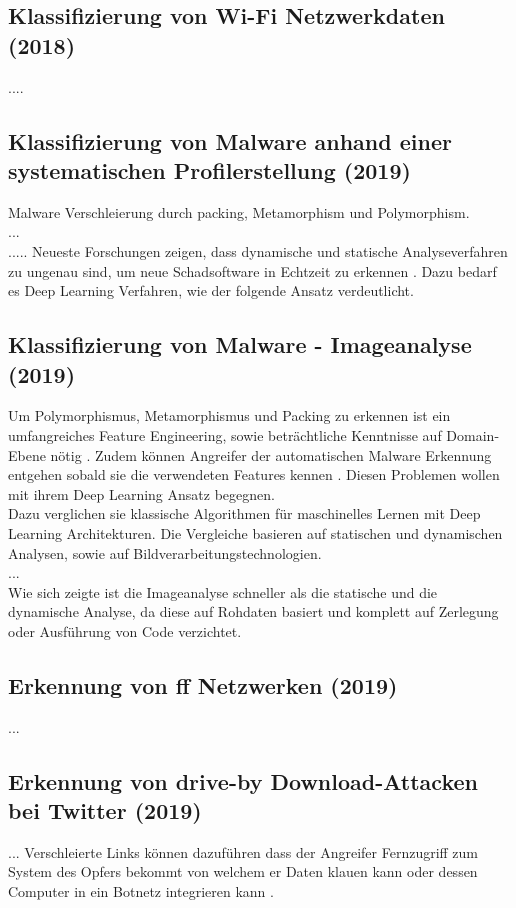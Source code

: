 \documentclass[
    12pt, %
    DIV10,
    ngerman, %
    a4paper, %
    oneside, %
    titlepage, %
    parskip=half, %
    headings=normal, %
    listof=totoc, %
    bibliography=totoc, %
    index=totoc, %
    captions=tableheading, %
    final %
]{scrreprt}
\begin{document}
\subsection{Klassifizierung von Wi-Fi Netzwerkdaten (2018)}
\textcite{Qin2018}....
%
%
\subsection{Klassifizierung von Malware anhand einer systematischen Profilerstellung (2019)}
\textcite{he2017model} Malware Verschleierung durch packing, Metamorphism und Polymorphism.\\
\textcite{Han2019}...\\
.....
Neueste Forschungen zeigen, dass dynamische und statische Analyseverfahren zu ungenau sind, um neue Schadsoftware in Echtzeit zu erkennen \parencite{Vinayakumar2019}. Dazu bedarf es Deep Learning Verfahren, wie der folgende Ansatz verdeutlicht.
%
\subsection{Klassifizierung von Malware - Imageanalyse (2019)}
Um Polymorphismus, Metamorphismus und Packing zu erkennen ist ein umfangreiches Feature Engineering, sowie beträchtliche Kenntnisse auf Domain-Ebene nötig \parencite{rhode2018early}. Zudem können Angreifer der automatischen Malware Erkennung entgehen sobald sie die verwendeten Features kennen \parencite{anderson2017evading}. Diesen Problemen wollen \textcite{Vinayakumar2019} mit ihrem Deep Learning Ansatz begegnen.\\
Dazu verglichen sie klassische Algorithmen für maschinelles Lernen mit Deep Learning Architekturen. Die Vergleiche basieren auf statischen und dynamischen Analysen, sowie auf Bildverarbeitungstechnologien.\\
...\\ 
Wie sich zeigte ist die Imageanalyse schneller als die statische und die dynamische Analyse, da diese auf Rohdaten basiert und komplett auf Zerlegung oder Ausführung von Code verzichtet.


\subsection{Erkennung von \ac{ff} Netzwerken (2019)}
\textcite{Chen2019}...
%
\subsection{Erkennung von drive-by Download-Attacken bei Twitter (2019)}
\textcite{Javed2019}...
Verschleierte Links können dazuführen dass der Angreifer Fernzugriff zum System des Opfers bekommt von welchem er Daten klauen kann oder dessen Computer in ein Botnetz integrieren kann \parencite{provos2007ghost}.
%
\end{document}
